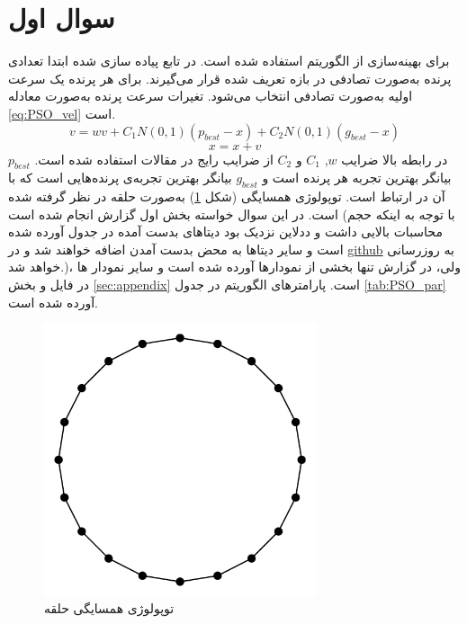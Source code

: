 \section{سوال اول}
برای بهینه‌سازی از الگوریتم 
استفاده شده است. در تابع پیاده سازی شده ابتدا تعدادی پرنده به‌صورت تصادفی در بازه تعریف شده قرار می‌گیرند. برای هر پرنده یک سرعت اولیه به‌صورت تصادفی انتخاب می‌شود. تغیرات سرعت پرنده به‌صورت معادله
\ref{eq:PSO_vel}
 است.
\begin{equation}\label{eq:PSO_vel}
	v = w v + C_1  N(0, 1)  (p_{best} - x) + C_2   N(0, 1)  (g_{best} - x)
\end{equation}
\begin{equation}
	x = x + v
\end{equation}
در رابطه بالا ضرایب
 $w$, 
 $C_1$
 و
 $C_2$ 
 از ضرایب رایج در مقالات استفاده شده است. $p_{best}$ بیانگر بهترین تجربه هر پرنده است و
 $g_{best}$
 بیانگر بهترین تجربه‌ی پرنده‌هایی است که با آن در ارتباط است. توپولوژی همسایگی (شکل \ref{fig:ring}) به‌صورت حلقه 
 در نظر گرفته شده است.
 در این سوال خواسته بخش اول گزارش
 انجام شده است (با توجه به اینکه حجم محاسبات بالایی داشت و ددلاین نزدیک بود دیتاهای بدست آمده در جدول آورده شده است و سایر دیتاها به محض بدست آمدن اضافه خواهند شد و در
 \href{https://github.com/alibaniasad1999/Heuristic-optimization-algorithms}{github}
 به روزرسانی خواهد شد.)، ولی، در گزارش تنها بخشی از نمودارها آورده شده است و سایر نمودار ها در فایل
و بخش
\ref{sec:appendix}
است.
 پارامترهای الگوریتم  در جدول
 \ref{tab:PSO_par}
 آورده شده است.
 \begin{figure}[H]\label{fig:ring}
 	\caption{توپولوژی همسایگی حلقه} 
 	\centering 
 	\includegraphics[width=8cm]{../Figure/Q1/ring.jpg} 
 \end{figure}


